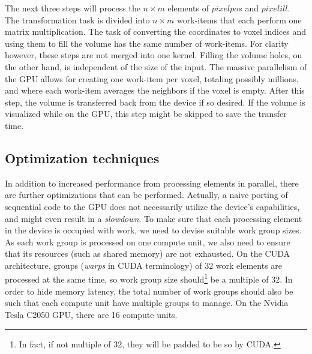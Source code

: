 The next three steps will process the $n \times m$ elements of $pixelpos$ and $pixelill$. The transformation task is divided into $n \times m$ work-items that each perform one matrix multiplication. The task of converting the coordinates to voxel indices and using them to fill the volume has the same number of work-items. For clarity however, these steps are not merged into one kernel. Filling the volume holes, on the other hand, is independent of the size of the input. The massive parallelism of the GPU allows for creating one work-item per voxel, totaling possibly millions, and where each work-item averages the neighbors if the voxel is empty. After this step, the volume is transferred back from the device if so desired. If the volume is visualized while on the GPU, this step might be skipped to save the transfer time.


\subsection{Optimization techniques}


In addition to increased performance from processing elements in parallel, there are further optimizations that can be performed. Actually, a naive porting of sequential code to the GPU does not necessarily utilize the device's capabilities, and might even result in a \emph{slowdown}. To make sure that each processing element in the device is occupied with work, we need to devise suitable work group sizes. As each work group is processed on one compute unit, we also need to ensure that its resources (such as shared memory) are not exhausted. On the CUDA architecture, groups (\emph{warps} in CUDA terminology) of 32 work elements are processed at the same time, so work group size should\footnote{In fact, if not multiple of 32, they will be padded to be so by CUDA.} be a multiple of 32. In order to hide memory latency, the total number of work groups should also be such that each compute unit have multiple groups to manage. On the Nvidia Tesla C2050 GPU, there are 16 compute units.

